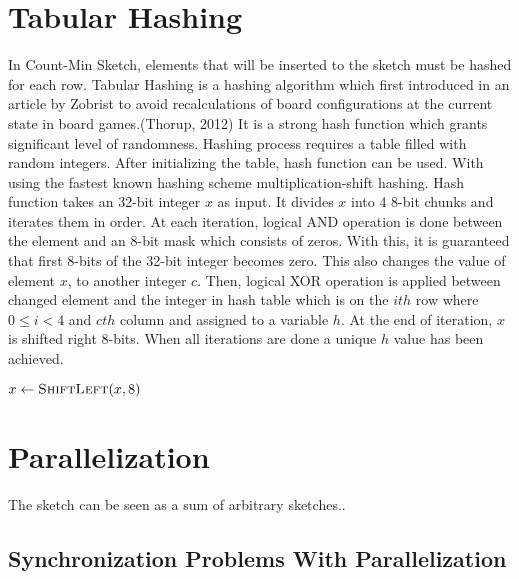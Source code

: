 \documentclass[10pt, conference, compsocconf]{IEEEtran}
\begin{document}
    \section{Tabular Hashing}
    In Count-Min Sketch, elements that will be inserted to the sketch must be hashed for each row. Tabular Hashing is a hashing algorithm which first introduced in an article by Zobrist to avoid recalculations of board configurations at the current state in board games.(Thorup, 2012) It is a  strong hash function which grants significant level of randomness. Hashing  process requires a table filled with random integers.  After  initializing the table, hash function can be used. With using the fastest known hashing scheme multiplication-shift hashing. Hash function takes an 32-bit integer $x$ as input. It divides $x$ into 4 8-bit chunks and iterates them in order. At each iteration, logical AND operation is done between the element and an 8-bit mask which consists of zeros.
    With this, it is guaranteed that first 8-bits of the 32-bit integer becomes zero. This also changes the value of element $x$, to another integer $c$. Then, logical XOR operation is applied between changed element and the integer in hash table which is on the $ith$ row where $0 \leq i < 4$ and $cth$ column and assigned to a variable $h$. At the end of iteration, $x$ is shifted right 8-bits. When all iterations are done a unique $h$ value has been achieved.
	 \begin{algorithm}
		\small
		
	
		\begin{algorithmic}[1]
			\State $x \gets \Call{ShiftLeft}{x,8}$
			\EndFor
			\EndFunction
		\end{algorithmic}
		
	\end{algorithm}
	


    \section{Parallelization}
    The sketch can be seen as a sum of arbitrary sketches..
    \subsection{Synchronization Problems With Parallelization}
\end{document}
